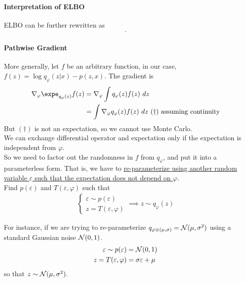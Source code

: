\documentclass{article}
\begin{document}
	\paragraph{Interpretation of ELBO} ELBO can be further rewritten as
	\begin{align}
		.
	\end{align}
	
	\paragraph{Pathwise Gradient} More generally, let $f$ be an arbitrary function, in our case, $f(z) = \log q_\varphi(z|x) - p(z, x)$. The gradient is
	\begin{align}
		\nabla_\varphi \expe_{q_\varphi(z)} f(z) &= \nabla_\varphi \int q_\varphi(z) f(z)\ dz \\
		&= \int \nabla_\varphi q_\varphi(z) f(z)\ dz\ (\dagger)\tx{ assuming continuity}
	\end{align}
	But $(\dagger)$ is not an expectation, so we cannot use Monte Carlo. \\
	We can exchange differential operator and expectation only if the expectation is independent from $\varphi$. \\
	So we need to factor out the randomness in $f$ from $q_\varphi$, and put it into a parameterless form. That is, we have to
	\ul{re-parameterize using another random variable $\varepsilon$ such that the expectation does not depend on $\varphi$}. \\
	Find $p(\varepsilon)$ and $T(\varepsilon, \varphi)$ such that
	\begin{align}
		\begin{cases}
			\varepsilon \sim p(\varepsilon) \\ 
			z = T(\varepsilon, \varphi)
		\end{cases}
		\implies z \sim q_\varphi(z)
	\end{align}
	
	\begin{example}
		For instance, if we are trying to re-parameterize $q_{\varphi\equiv(\mu, \sigma)} = \mathcal{{N}}(\mu, \sigma^2)$ using a standard Gaussian noise $\mathcal{{N}}(0, 1)$.
		\begin{align}
			\varepsilon \sim p(\varepsilon) &= \mathcal{{N}}(0, 1) \\
			z = T(\varepsilon, \varphi) &= \sigma \varepsilon + \mu
		\end{align}
		so that $z \sim \mathcal{{N}}(\mu, \sigma^2)$.
	\end{example}
	
\end{document}
